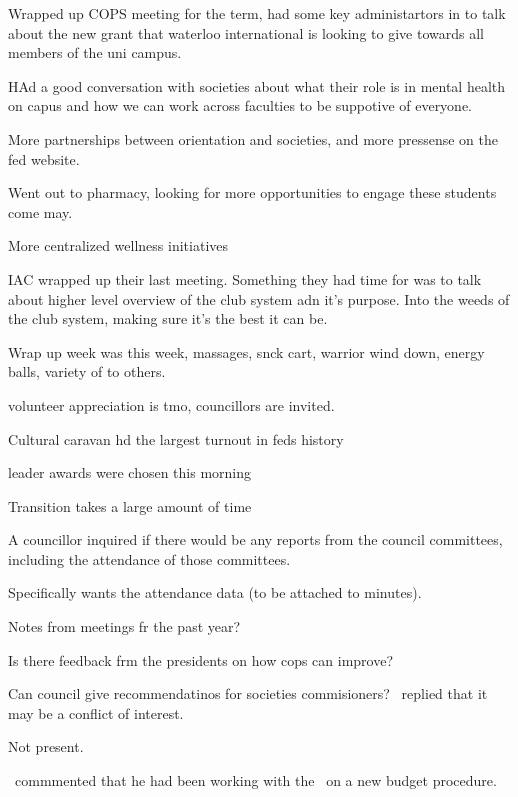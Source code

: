 \begin{information}
    Wrapped up COPS meeting for the term, had some key administartors in to
    talk about the new grant that waterloo international is looking to give
    towards all members of the uni campus.

    HAd a good conversation with societies about what their role is in mental
    health on capus and how we can work across faculties to be suppotive of
    everyone.

    More partnerships between orientation and societies, and more pressense
    on the fed website.

    Went out to pharmacy, looking for more opportunities to engage these students
    come may.

    More centralized wellness initiatives

    IAC wrapped up their last meeting. Something they had time for was to talk
    about higher level overview of the club system adn it's purpose. Into the
    weeds of the club system, making sure it's the best it can be.

    Wrap up week was this week, massages, snck cart, warrior wind down, energy
    balls, variety of to others.

    volunteer appreciation is tmo, councillors are invited.

    Cultural caravan hd the largest turnout in feds history

    leader awards were chosen this morning

    Transition takes a large amount of time

    A councillor inquired if there would be any reports from the council 
    committees, including the attendance of those committees. 

    Specifically wants the attendance data (to be attached to minutes).

    Notes from meetings fr the past year?

    Is there feedback frm the presidents on how cops can improve?

    Can council give recommendatinos for societies commisioners? \vpi\ replied
    that it may be a conflict of interest.

\end{information}

\begin{information}

    Not present.

    \seneca\ commmented that he had been working with the \vpof\ on a new
    budget procedure.

\end{information}

